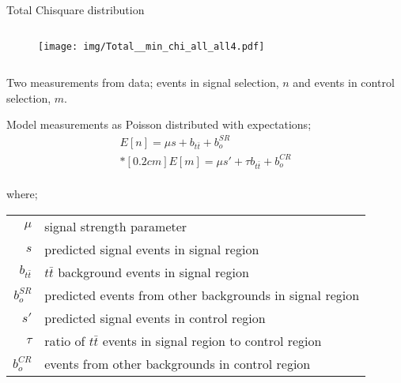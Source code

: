 \documentclass{beamer}
\begin{document}
\begin{frame}{Total Chisquare distribution}
  \begin{columns}
    \begin{column}{0.5\textwidth}\begin{figure}
      \texttt{[image: img/Total\_\_min\_chi\_all\_all4.pdf]}
    \end{figure}\end{column}
  \end{columns}
\end{frame}

\begin{frame}%
Two measurements from data; events in signal selection, $n$ and events in control selection, $m$.

Model measurements as Poisson distributed with expectations;
\begin{eqnarray*}
    E[n] = \mu s + b_{t\bar{t}} + b_{o}^{SR} \\*[0.2 cm]
    E[m] = \mu s' + \tau b_{t\bar{t}} + b_{o}^{CR}
\end{eqnarray*} \\



where; \\
 \begin{tabular}{r l}
     $\mu$ & signal strength parameter \\
     $s$ & predicted signal events in signal region \\
     $b_{t\bar{t}}$ & $t\bar{t}$ background events in signal region \\
     $b_{o}^{SR}$ & predicted events from other backgrounds in signal region \\
     $s'$ & predicted signal events in control region \\
     $\tau$ & ratio of $t\bar{t}$ events in signal region to control region \\
     $b_{o}^{CR}$ & events from other backgrounds in control region
 \end{tabular}

\end{frame}
\end{document}
